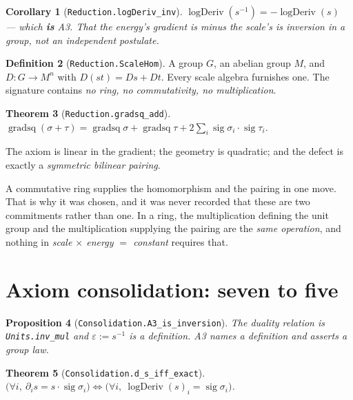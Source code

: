 \documentclass[11pt,a4paper]{article}
\newtheorem{theorem}{Theorem}[section]
\newtheorem{proposition}[theorem]{Proposition}
\newtheorem{corollary}[theorem]{Corollary}
\theoremstyle{definition}
\newtheorem{definition}[theorem]{Definition}
\theoremstyle{remark}
\newcommand{\lean}[1]{\texttt{\small #1}}
\newcommand{\sg}{\sigma}
\begin{document}
\begin{corollary}[\lean{Reduction.logDeriv\_inv}]
$\operatorname{logDeriv}(s^{-1})=-\operatorname{logDeriv}(s)$ --- which
\textbf{is} A3. That the energy's gradient is minus the scale's is inversion in a
group, not an independent postulate.
\end{corollary}

\begin{definition}[\lean{Reduction.ScaleHom}]
A group $G$, an abelian group $M$, and $D\colon G\to M^{n}$ with $D(st)=Ds+Dt$.
Every scale algebra furnishes one. The signature contains \emph{no ring, no
commutativity, no multiplication}.
\end{definition}

\begin{theorem}[\lean{Reduction.gradsq\_add}]
$\operatorname{gradsq}(\sg+\tau)=\operatorname{gradsq}\sg+\operatorname{gradsq}\tau
+2\sum_i\operatorname{sig}\sg_i\cdot\operatorname{sig}\tau_i$.
\end{theorem}

The axiom is linear in the gradient; the geometry is quadratic; and the defect is
exactly a \emph{symmetric bilinear pairing}.

\begin{claimbox}
A commutative ring supplies the homomorphism and the pairing in one move. That is
why it was chosen, and it was never recorded that these are two commitments rather
than one. In a ring, the multiplication defining the unit group and the
multiplication supplying the pairing are the \emph{same operation}, and nothing in
\emph{scale $\times$ energy $=$ constant} requires that.
\end{claimbox}

\section{Axiom consolidation: seven to five}
\label{sec:consolidation}

\begin{proposition}[\lean{Consolidation.A3\_is\_inversion}]
The duality relation is \lean{Units.inv\_mul} and $\varepsilon:=s^{-1}$ is a
definition. A3 names a definition and asserts a group law.
\end{proposition}

\begin{theorem}[\lean{Consolidation.d\_s\_iff\_exact}]
$\bigl(\forall i,\ \partial_i s=s\cdot\operatorname{sig}\sg_i\bigr)
\iff
\bigl(\forall i,\ \operatorname{logDeriv}(s)_i=\operatorname{sig}\sg_i\bigr)$.
\end{theorem}
\end{document}
